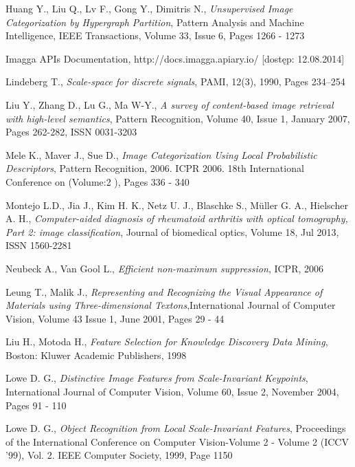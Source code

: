 \begin{thebibliography}{100}

 Huang Y., Liu Q., Lv F., Gong Y., Dimitris N., \emph{Unsupervised Image Categorization by Hypergraph Partition}, Pattern Analysis and Machine Intelligence, IEEE Transactions, Volume 33, Issue 6, Pages 1266 - 1273

 Imagga APIs Documentation, http://docs.imagga.apiary.io/ [dostęp: 12.08.2014]

 Lindeberg T., \emph{Scale-space for discrete signals}, PAMI, 12(3), 1990, Pages 234–254

 Liu Y., Zhang D., Lu G., Ma W-Y., \emph{A survey of content-based image retrieval with high-level semantics}, Pattern Recognition, Volume 40, Issue 1, January 2007, Pages 262-282, ISSN 0031-3203

 Mele K., Maver J., Sue D., \emph{Image Categorization Using Local Probabilistic Descriptors}, Pattern Recognition, 2006. ICPR 2006. 18th International Conference on  (Volume:2 ), Pages 336 - 340

 Montejo L.D., Jia J., Kim H. K., Netz U. J., Blaschke S., Müller G. A., Hielscher A. H., \emph{Computer-aided diagnosis of rheumatoid arthritis with optical tomography, Part 2: image classification}, Journal of biomedical optics, Volume 18, Jul 2013, ISSN 1560-2281

 Neubeck A., Van Gool L., \emph{Efficient non-maximum suppression}, ICPR, 2006

 Leung T., Malik J., \emph{Representing and Recognizing the Visual Appearance of Materials using Three-dimensional Textons},International Journal of Computer Vision, Volume 43 Issue 1, June 2001, Pages 29 - 44 

 Liu H., Motoda H., \emph{Feature Selection for Knowledge Discovery Data Mining}, Boston: Kluwer Academic Publishers, 1998

 Lowe D. G., \emph{Distinctive Image Features from Scale-Invariant Keypoints}, International Journal of Computer Vision, Volume 60, Issue 2, November 2004, Pages 91 - 110 

 Lowe D. G., \emph{Object Recognition from Local Scale-Invariant Features}, Proceedings of the International Conference on Computer Vision-Volume 2 - Volume 2 (ICCV '99), Vol. 2. IEEE Computer Society, 1999, Page 1150


\end{thebibliography}
